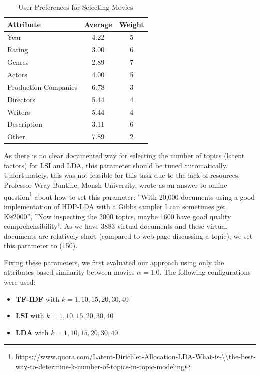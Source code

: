 \documentclass{sigish}
\begin{document}
\begin{table}[]
\centering
\begin{tabular}{|l|c|c|}
\hline
\textbf{Attribute}   & \textbf{Average} & \textbf{Weight} \\ \hline
Year                 & 4.22             & 5               \\ \hline
Rating               & 3.00             & 6               \\ \hline
Genres               & 2.89             & 7               \\ \hline
Actors               & 4.00             & 5               \\ \hline
Production Companies & 6.78             & 3               \\ \hline
Directors            & 5.44             & 4               \\ \hline
Writers              & 5.44             & 4               \\ \hline
Description          & 3.11             & 6               \\ \hline
Other                & 7.89             & 2               \\ \hline  
\end{tabular}
\caption{User Preferences for Selecting Movies}
\label{tab:preferences}
\end{table}

As there is no clear documented way for selecting the number of topics (latent factors) for LSI and LDA, this parameter should be tuned automatically. Unfortunately, this was not feasible for this task due to the lack of resources. Professor Wray Buntine, Monsh University, wrote as an answer to online question\footnote{\url{https://www.quora.com/Latent-Dirichlet-Allocation-LDA-What-is-\\the-best-way-to-determine-k-number-of-topics-in-topic-modeling}} about how to set this parameter: ''With 20,000 documents using a good implementation of HDP-LDA with a Gibbs sampler I can sometimes get  K≈2000'', ''Now inspecting the 2000 topics, maybe 1600 have good quality comprehensibility''. As we have 3883 virtual documents and these virtual documents are relatively short (compared to web-page discussing a topic), we set this parameter to (150).

Fixing these parameters, we first evaluated our approach using only the attributes-based similarity between movies $ \alpha=1.0 $. The following configurations were used:
\begin{itemize}
\item \textbf{TF-IDF} with $ k = {1, 10, 15, 20, 30, 40} $
\item \textbf{LSI} with $ k = {1, 10, 15, 20, 30, 40} $
\item \textbf{LDA} with $ k = {1, 10, 15, 20, 30, 40} $
\end{itemize}
\end{document}
